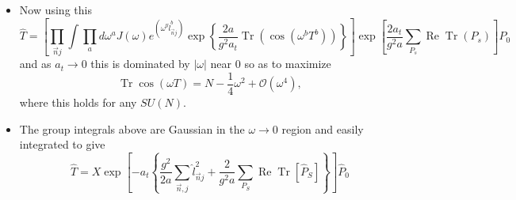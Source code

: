 \begin{itemize}
\begin{itemize}
       They satisfy
       \begin{align}
           [\hat l_{\vec{n}j}^a, \hat l_{\vec{m}k}^b] &= i f^{abc}\hat l_{\vec{n}j}^c \delta_{\vec{n},\vec{m}}\delta_{j k} \\
           [\hat l_{\vec{n}j}^a, \hat U_{\vec{m}k}] &= - T^a \hat U_{\vec{n}j} \delta_{\vec{n}, \vec{m}}\delta_{j k}\\
           [\hat l_{\vec{n}j}^a, \hat U_{\vec{m}+\hat{k},-k}] &=\hat U_{\vec{m}+\hat{k},-k}T^a \delta_{\vec{n},\vec{m}} \delta_{j k}\\
           [\hat l^2_{\vec{n}j}, \hat l^a_{\vec{m}k}] &= [\hat l^2_{\vec{n}j}, \hat R_{\vec{m}k}] = 0 
       \end{align}
       where $\hat l^2_{\vec{n}j} = \sum_a \hat l_{\vec{n} j}^a$ is quadratic Casimir
       and  the Casimir doesn't depend on link direction, i.e.
       \begin{equation}
           \hat l^2_{\vec{n}j} = \hat l^2_{\vec{n}+\hat{j},-j}
       \end{equation}
       The operators for different links commute with each other, and the $\hat l_{\vec{n}j}^a$ are differential operators on the group parameters.
       \item Now using this
       \begin{equation}
        \hat{T}=\left[\prod_{\vec{n}j} \int \prod_{a} d \omega^{a} J(\omega) e^{\left(\omega^{b} \hat l^b_{\vec{n} j}\right)}  \exp \left\{\frac{2 a}{g^2 a_{t}} \operatorname{Tr}\left(\cos \left(\omega^{b} T^{b}\right)\right)\right\}\right] \exp \left[\frac{2 a_{t}}{g^{2} a} \sum_{P_{s}} \operatorname{Re} \operatorname{Tr}\left(P_{s}\right)\right] \hat{P}_0
        \end{equation}
        and as $a_t \rightarrow 0$ this is dominated by $|\omega|$ near $0$ so as to maximize
        \begin{equation}
            \operatorname{Tr} \cos (\omega T) = N - \frac{1}{4}\omega^2 + \mathcal{O}(\omega^4),
        \end{equation}
        where this holds for any $SU(N)$.
        \item The group integrals above are Gaussian in the $\omega \rightarrow 0$ region and easily integrated to give
        \begin{equation}
        \hat{T}=X \exp \left[-a_t\left\{\frac{g^{2}}{2 a} \sum_{\vec{n},j} \hat{l}_{\vec{n}j}^{2}+\frac{2}{g^{2} a} \sum_{P_{S}} \operatorname{Re} \operatorname{Tr}\left[\hat{P}_{S}\right]\right\}\right] \hat{P}_{0}
        \end{equation}

\end{itemize}
\end{itemize}
